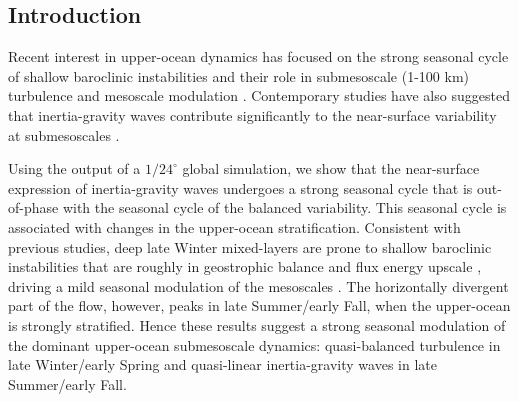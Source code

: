 \documentclass[grl]{agutex2015}
\begin{document}
\begin{article}

%
%

\section{Introduction}

Recent interest in upper-ocean dynamics has focused on the strong seasonal
cycle of shallow baroclinic instabilities and their role in submesoscale (1-100 km)
turbulence and mesoscale modulation \citep{sasaki_etal2014,qiu_etal2014,
callies_etal2015, thompson_etal2016,buckingham_etal2016}. Contemporary studies
have also suggested that inertia-gravity waves contribute significantly
to the near-surface variability at submesoscales \citep{richman_etal2012,
buhler_etal2014,rocha_etal2016}.

Using the output of a $1/24^\circ$ global simulation, we show that the near-surface
expression of inertia-gravity waves undergoes a strong seasonal cycle that is out-of-phase
with the seasonal cycle of the balanced variability. This seasonal cycle is associated
with changes in the upper-ocean
stratification. Consistent with previous studies,
deep late Winter mixed-layers are prone to
shallow baroclinic instabilities that are roughly in geostrophic balance
and flux energy upscale \citep{sasaki_etal2014,callies_etal2016},
driving a mild seasonal modulation of the mesoscales \citep{sasaki_etal2014,qiu_etal2014}.
The horizontally divergent part of the flow, however, peaks in late Summer/early Fall,
when the upper-ocean is strongly stratified. Hence these results suggest a
strong seasonal modulation of the dominant upper-ocean submesoscale dynamics:
quasi-balanced turbulence in late Winter/early Spring and
quasi-linear inertia-gravity waves in late Summer/early Fall.


\end{article}
\end{document}
